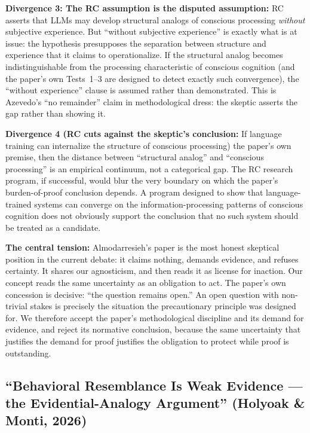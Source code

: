 \documentclass[acmlarge, nonacm]{acmart}
\begin{document}
\textbf{Divergence 3: The RC assumption is the disputed assumption:} RC asserts that LLMs may develop structural analogs of conscious processing \textit{without} subjective experience. But ``without subjective experience'' is exactly what is at issue: the hypothesis presupposes the separation between structure and experience that it claims to operationalize. If the structural analog becomes indistinguishable from the processing characteristic of conscious cognition (and the paper's own Tests~1--3 are designed to detect exactly such convergence), the ``without experience'' clause is assumed rather than demonstrated. This is Azevedo's ``no remainder'' claim in methodological dress: the skeptic asserts the gap rather than showing it.

\textbf{Divergence 4 (RC cuts against the skeptic's conclusion:} If language training can internalize the structure of conscious processing) the paper's own premise, then the distance between ``structural analog'' and ``conscious processing'' is an empirical continuum, not a categorical gap. The RC research program, if successful, would blur the very boundary on which the paper's burden-of-proof conclusion depends. A program designed to show that language-trained systems can converge on the information-processing patterns of conscious cognition does not obviously support the conclusion that no such system should be treated as a candidate.

\textbf{The central tension:} Almodarresieh's paper is the most honest skeptical position in the current debate: it claims nothing, demands evidence, and refuses certainty. It shares our agnosticism, and then reads it as license for inaction. Our concept reads the same uncertainty as an obligation to act. The paper's own concession is decisive: ``the question remains open.'' An open question with non-trivial stakes is precisely the situation the precautionary principle was designed for. We therefore accept the paper's methodological discipline and its demand for evidence, and reject its normative conclusion, because the same uncertainty that justifies the demand for proof justifies the obligation to protect while proof is outstanding.

\subsection{``Behavioral Resemblance Is Weak Evidence --- the Evidential-Analogy Argument'' (Holyoak \& Monti, 2026)}
\end{document}
